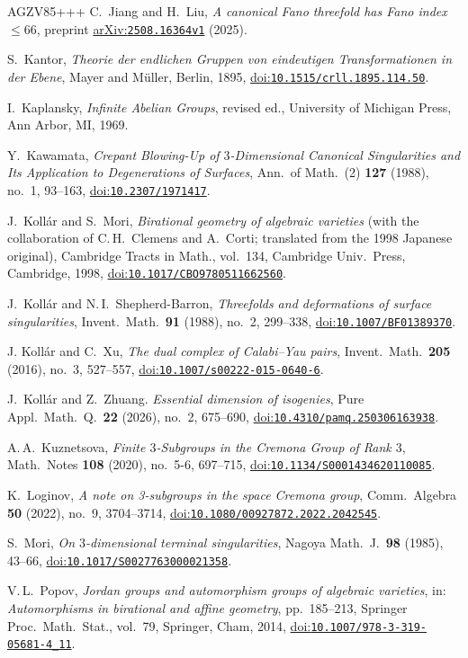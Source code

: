 \documentclass[10pt,a4paper]{article}
\newcommand{\doi}[1]{\href{https://doi.org/#1}{doi:\nolinkurl{#1}}}
\newcommand{\arXiv}[1]{\href{https://arxiv.org/abs/#1}{arXiv:\nolinkurl{#1}}}
\theoremstyle{definition}
\theoremstyle{remark}
\begin{document}
\begin{thebibliography}{AGZV85+++}
C.~Jiang and H.~Liu,
{\em A canonical Fano threefold has Fano index $\leq66$}, 
preprint \arXiv{2508.16364v1} (2025).

S.~Kantor,
{\em Theorie der endlichen Gruppen von eindeutigen Transformationen in der Ebene}, Mayer and M\"uller, Berlin, 1895,
\doi{10.1515/crll.1895.114.50}.

I.~Kaplansky,
{\em Infinite Abelian Groups}, revised ed.,
University of Michigan Press, Ann Arbor, MI, 1969.

Y.~Kawamata,
 {\em Crepant Blowing-Up of $3$-Dimensional Canonical Singularities and Its Application to Degenerations of Surfaces}, 
 Ann.\ of Math.~(2) \textbf{127} (1988), no.~1, 93--163,
 \doi{10.2307/1971417}.

  J.~Koll\'{a}r and S.~Mori,
  {\em Birational geometry of algebraic varieties} 
 (with the collaboration of C.\,H.~Clemens and A.~Corti; translated from the 1998 Japanese original), Cambridge Tracts in Math., vol.~134, Cambridge Univ.\ Press, Cambridge, 1998, \doi{10.1017/CBO9780511662560}.

J.~Koll\'ar and N.\,I.~Shepherd-Barron,
 {\em Threefolds and deformations of surface singularities},
 Invent.\ Math.\ \textbf{91} (1988), no.~2, 299--338,
\doi{10.1007/BF01389370}.
 
J. Koll\'{a}r and C.~Xu,
 {\em The dual complex of Calabi--Yau pairs}, 
 Invent.\ Math.\ \textbf{205} (2016), no.~3, 527--557,
 \doi{10.1007/s00222-015-0640-6}.

J.~Koll\'{a}r and Z.~Zhuang.
{\em Essential dimension of isogenies},
Pure Appl.\ Math.~Q.\ \textbf{22} (2026), no.~2, 675--690,
\doi{10.4310/pamq.250306163938}.


A.\,A.~Kuznetsova, 
 {\em Finite $3$-Subgroups in the Cremona Group of Rank $3$},
 Math.\ Notes \textbf{108} (2020), no.~5-6, 697--715,
 \doi{10.1134/S0001434620110085}.

K.~Loginov, 
 {\em A note on 3-subgroups in the space Cremona group}, 
 Comm.\ Algebra \textbf{50} (2022), no.~9, 3704--3714,
 \doi{10.1080/00927872.2022.2042545}.

S.~Mori, 
 {\em On $3$-dimensional terminal singularities}, 
 Nagoya Math.~J.\ \textbf{98} (1985), 43--66,
 \doi{10.1017/S0027763000021358}.

V.\,L.~Popov,
 {\em Jordan groups and automorphism groups of algebraic varieties}, 
 in: {\em Automorphisms in birational and affine geometry}, pp.~185--213, Springer Proc.\ Math.\ Stat., vol.~79, Springer, Cham, 2014,
 \doi{10.1007/978-3-319-05681-4_11}.
  

\end{thebibliography}
\end{document}
